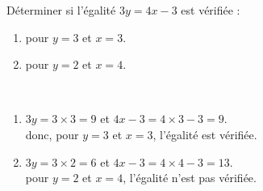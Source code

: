 \begin{exercice*} %
   Déterminer si l'égalité $3y =4x-3$ est vérifiée :
   \begin{enumerate}
      \item pour $y =3$ et $x =3$.
      \item pour $y =2$ et $x =4$.
   \end{enumerate}
\end{exercice*}

\begin{corrige}
   \ \\ [-5mm]
   \begin{enumerate}
      \item $3y =3\times3 =9$ et $4x-3 =4\times3-3 =9$. \\
      donc, pour $y =3$ et $x =3$, {\red l'égalité est vérifiée}.
      \item $3y =3\times2 =6$ et $4x-3 =4\times4-3 =13$. \\
      pour $y =2$ et $x =4$, {\red l'égalité n'est pas vérifiée}.
   \end{enumerate}
\end{corrige}
